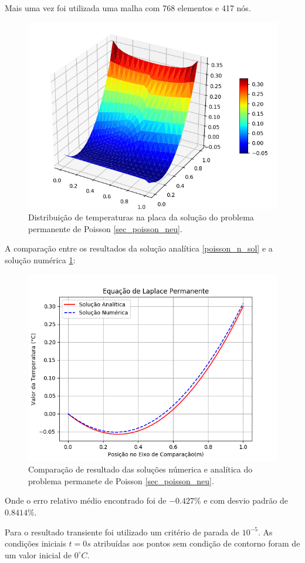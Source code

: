 Mais uma vez foi utilizada uma malha com 768 elementos e 417 nós.
\begin{figure}[H]
    \centering
    \includegraphics[width=.5\linewidth]{figures/poisson_neumann_permanent_3d.png}
    \caption{Distribuição de temperaturas na placa da solução do problema permanente de Poisson \ref{sec_poisson_neu}.}
    \label{poisson_n_3d}
\end{figure}

A comparação entre os resultados da solução analítica \ref{poisson_n_sol} e a solução numérica \ref{poisson_n_3d}:
\begin{figure}[H]
    \centering
    \includegraphics[width=.7\linewidth]{figures/poisson_neumann_permanent_comparison.png}
    \caption{Comparação de resultado das soluções númerica e analítica do problema permanete de Poisson \ref{sec_poisson_neu}.}
    \label{poisson_n_perm_comp}
\end{figure}
Onde o erro relativo médio encontrado foi de $-0.427\%$ e com desvio padrão de $0.8414\%$.

Para o resultado transiente foi utilizado um critério de parada de $10^{-5}$.
As condições iniciais $t=0s$ atribuídas aos pontos sem condição de contorno foram de um valor inicial de $0^{\circ}C$.

